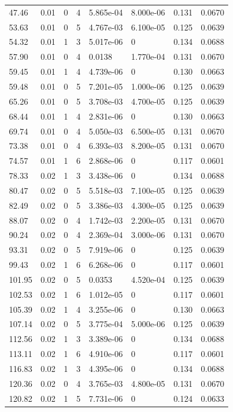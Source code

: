 \documentclass[preview]{standalone}
\begin{document}
{{\begin{tabular}{L{1.2cm}C{1.2cm} C{0.3cm}C{0.5cm} C{1.4cm}C{1.4cm} C{1.4cm}C{1.4cm}}
  47.46  &  0.01  & 0     &  4 &  5.865e-04  & 8.000e-06  & 0.131 &  0.0670   \\ 
  53.63  &  0.01  & 0     &  5 &  4.767e-03  & 6.100e-05  & 0.125 &  0.0639   \\ 
  54.32  &  0.01  & 1     &  3 &  5.017e-06  & 0  & 0.134 &  0.0688   \\ 
  57.90  &  0.01  & 0     &  4 &  0.0138  & 1.770e-04  & 0.131 &  0.0670   \\ 
  59.45  &  0.01  & 1     &  4 &  4.739e-06  & 0  & 0.130 &  0.0663   \\ 
  59.48  &  0.01  & 0     &  5 &  7.201e-05  & 1.000e-06  & 0.125 &  0.0639   \\ 
  65.26  &  0.01  & 0     &  5 &  3.708e-03  & 4.700e-05  & 0.125 &  0.0639   \\ 
  68.44  &  0.01  & 1     &  4 &  2.831e-06  & 0  & 0.130 &  0.0663   \\ 
  69.74  &  0.01  & 0     &  4 &  5.050e-03  & 6.500e-05  & 0.131 &  0.0670   \\ 
  73.38  &  0.01  & 0     &  4 &  6.393e-03  & 8.200e-05  & 0.131 &  0.0670   \\ 
  74.57  &  0.01  & 1     &  6 &  2.868e-06  & 0  & 0.117 &  0.0601   \\ 
  78.33  &  0.02  & 1     &  3 &  3.438e-06  & 0  & 0.134 &  0.0688   \\ 
  80.47  &  0.02  & 0     &  5 &  5.518e-03  & 7.100e-05  & 0.125 &  0.0639   \\ 
  82.49  &  0.02  & 0     &  5 &  3.386e-03  & 4.300e-05  & 0.125 &  0.0639   \\ 
  88.07  &  0.02  & 0     &  4 &  1.742e-03  & 2.200e-05  & 0.131 &  0.0670   \\ 
  90.24  &  0.02  & 0     &  4 &  2.369e-04  & 3.000e-06  & 0.131 &  0.0670   \\ 
  93.31  &  0.02  & 0     &  5 &  7.919e-06  & 0  & 0.125 &  0.0639   \\ 
  99.43  &  0.02  & 1     &  6 &  6.268e-06  & 0  & 0.117 &  0.0601   \\ 
  101.95  &  0.02  & 0     &  5 &  0.0353  & 4.520e-04  & 0.125 &  0.0639   \\ 
  102.53  &  0.02  & 1     &  6 &  1.012e-05  & 0  & 0.117 &  0.0601   \\ 
  105.39  &  0.02  & 1     &  4 &  3.255e-06  & 0  & 0.130 &  0.0663   \\ 
  107.14  &  0.02  & 0     &  5 &  3.775e-04  & 5.000e-06  & 0.125 &  0.0639   \\ 
  112.56  &  0.02  & 1     &  3 &  3.389e-06  & 0  & 0.134 &  0.0688   \\ 
  113.11  &  0.02  & 1     &  6 &  4.910e-06  & 0  & 0.117 &  0.0601   \\ 
  116.83  &  0.02  & 1     &  3 &  4.395e-06  & 0  & 0.134 &  0.0688   \\ 
  120.36  &  0.02  & 0     &  4 &  3.765e-03  & 4.800e-05  & 0.131 &  0.0670   \\ 
  120.82  &  0.02  & 1     &  5 &  7.731e-06  & 0  & 0.124 &  0.0633   \\ 
\hline 
\end{tabular} 

}}
\end{document}
